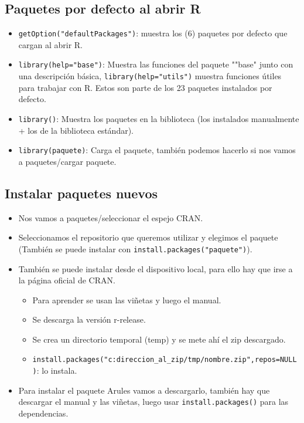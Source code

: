 \documentclass[a4paper, 12pt]{article}
\begin{document}
	\subsection{Paquetes por defecto al abrir R}
	\begin{itemize}
		\item \texttt{getOption("defaultPackages")}: muestra los (6) paquetes por defecto que cargan al abrir R.
		\item \texttt{library(help="base")}: Muestra las funciones del paquete ""base" junto con una descripción básica, \texttt{library(help=\string"utils")} muestra funciones útiles para trabajar con R. Estos son parte de los 23 paquetes instalados por defecto.
		\item \texttt{library()}: Muestra los paquetes en la biblioteca (los instalados manualmente + los de la biblioteca estándar).
		\item \texttt{library(paquete)}: Carga el paquete, también podemos hacerlo si nos vamos a paquetes/cargar paquete.
	\end{itemize}
	\subsection{Instalar paquetes nuevos}
	\begin{itemize}
		\item Nos vamos a paquetes/seleccionar el espejo CRAN.
		\item Seleccionamos el repositorio que queremos utilizar y elegimos el paquete (También se puede instalar con \texttt{install.packages(\string"paquete")}).
		\item También se puede instalar desde el dispositivo local, para ello hay que irse a la página oficial de CRAN.
		\begin{itemize}
			\item Para aprender se usan las viñetas y luego el manual.
			\item Se descarga la versión r-release.
			\item Se crea un directorio temporal (temp) y se mete ahí el zip descargado.
			\item \texttt{install.packages(\string"c:direccion\_al\_zip/tmp/nombre.zip",repos=NULL)}: lo instala.
		\end{itemize} 
		\item Para instalar el paquete Arules vamos a descargarlo, también hay que descargar el manual y las viñetas, luego usar \texttt{install.packages()} para las dependencias.
	\end{itemize}
	
\end{document}

